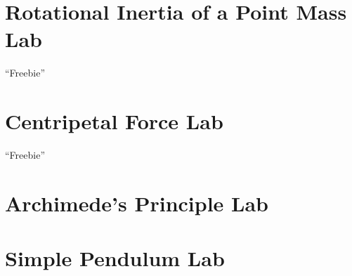 \documentclass{report}
\begin{document}
\chapter*{\centering Rotational Inertia of a Point Mass Lab}
\begin{center}
  \Huge ``Freebie''
\end{center}

\chapter*{\centering Centripetal Force Lab}
\begin{center}
  \Huge ``Freebie''
\end{center}

\chapter*{Archimede's Principle Lab}

\chapter*{Simple Pendulum Lab}
\end{document}
